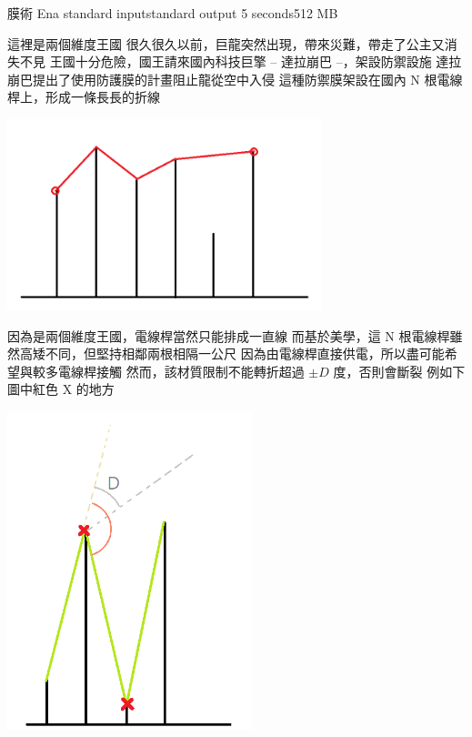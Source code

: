 \gdef\thisproblemauthor{}
\gdef\thisproblemdeveloper{}
\gdef\thisproblemorigin{}
\begin{problem}{膜術 Ena}
{standard input}{standard output}
{5 seconds}{512 MB}{}

這裡是兩個維度王國\newline
很久很久以前，巨龍突然出現，帶來災難，帶走了公主又消失不見\newline
王國十分危險，國王請來國內科技巨擎 -- 達拉崩巴 --，架設防禦設施\newline
達拉崩巴提出了使用防護膜的計畫阻止龍從空中入侵\newline
這種防禦膜架設在國內 N 根電線桿上，形成一條長長的折線\newline

\centerline{\includegraphics[height=15em]{./pics/D-1.png}}

因為是兩個維度王國，電線桿當然只能排成一直線\newline
而基於美學，這 N 根電線桿雖然高矮不同，但堅持相鄰兩根相隔一公尺\newline
\newline
因為由電線桿直接供電，所以盡可能希望與較多電線桿接觸\newline
\newline
然而，該材質限制不能轉折超過 $\pm D $ 度，否則會斷裂\newline
例如下圖中紅色 X 的地方\newline

\centerline{\includegraphics[height=25em]{./pics/D-2.png}}


\end{problem}

